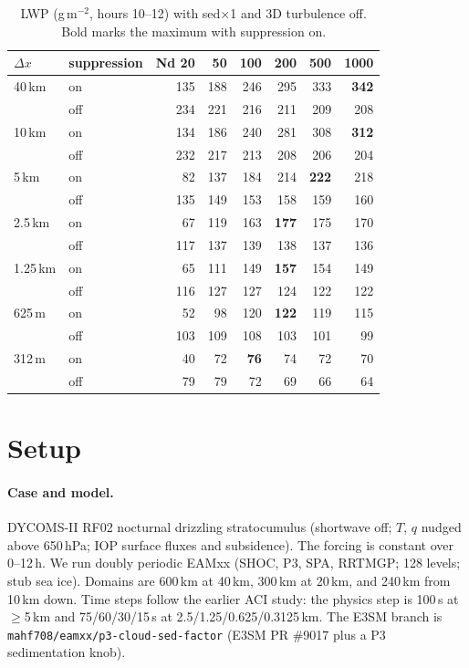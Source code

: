 \documentclass[10pt]{article}
\begin{document}
\begin{table}[H]\centering\small
\caption{LWP (g\,m$^{-2}$, hours 10--12) with sed$\times$1 and 3D turbulence off. Bold marks the maximum with suppression on.}\label{tab:lwp}
\begin{tabular}{@{}llrrrrrr@{}}
\toprule
$\Delta x$ & suppression & Nd 20 & 50 & 100 & 200 & 500 & 1000 \\ \midrule
40\,km & on & 135 & 188 & 246 & 295 & 333 & \textbf{342} \\
 & off & 234 & 221 & 216 & 211 & 209 & 208 \\
10\,km & on & 134 & 186 & 240 & 281 & 308 & \textbf{312} \\
 & off & 232 & 217 & 213 & 208 & 206 & 204 \\
5\,km & on & 82 & 137 & 184 & 214 & \textbf{222} & 218 \\
 & off & 135 & 149 & 153 & 158 & 159 & 160 \\
2.5\,km & on & 67 & 119 & 163 & \textbf{177} & 175 & 170 \\
 & off & 117 & 137 & 139 & 138 & 137 & 136 \\
1.25\,km & on & 65 & 111 & 149 & \textbf{157} & 154 & 149 \\
 & off & 116 & 127 & 127 & 124 & 122 & 122 \\
625\,m & on & 52 & 98 & 120 & \textbf{122} & 119 & 115 \\
 & off & 103 & 109 & 108 & 103 & 101 & 99 \\
312\,m & on & 40 & 72 & \textbf{76} & 74 & 72 & 70 \\
 & off & 79 & 79 & 72 & 69 & 66 & 64 \\ \bottomrule
\end{tabular}
\end{table}

\section{Setup}
\paragraph{Case and model.} DYCOMS-II RF02 nocturnal drizzling stratocumulus (shortwave off; $T$, $q$ nudged above 650\,hPa; IOP surface fluxes and
subsidence). The forcing is constant over 0--12\,h. We run doubly periodic EAMxx (SHOC, P3, SPA, RRTMGP; 128 levels; stub sea ice).
Domains are 600\,km at 40\,km, 300\,km at 20\,km, and 240\,km from 10\,km down.
Time steps follow the earlier ACI study: the physics step is 100\,s at $\geq$5\,km and 75/60/30/15\,s at 2.5/1.25/0.625/0.3125\,km.
The E3SM branch is \texttt{mahf708/eamxx/p3-cloud-sed-factor} (E3SM PR \#9017 plus a P3 sedimentation knob).
\end{document}
